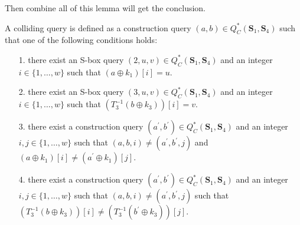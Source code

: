 Then combine all of this lemma will get the conclusion.






A colliding query is defined as a construction query $(a, b) \in Q_{C}^{*}\left(\mathbf{S}_{1},\mathbf{S}_{4}\right)$ such that one of the following conditions holds:

\begin{itemize}
  \item[1.]
  there exist an S-box query $(2, u, v) \in Q_{C}^{*}\left(\mathbf{S}_{1},\mathbf{S}_{4}\right)$ and an integer $i \in\{1, \ldots, w\}$ such that $\left(a \oplus k_{1}\right)[i]=u$.
  \item[2.]
  there exist an S-box query $(3, u, v) \in Q_{C}^{*}\left(\mathbf{S}_{1},\mathbf{S}_{4}\right)$ and an integer $i \in\{1, \ldots, w\}$ such that $\left(T_{3}^{-1}\left(b \oplus k_{3}\right)\right)[i]=v$.
  \item[3.]
  there exist a construction query $\left(a^{\prime}, b^{\prime}\right) \in Q_{C}^{*}\left(\mathbf{S}_{1},\mathbf{S}_{4}\right)$ and an integer $i,j \in\{1, \ldots, w\}$ such that $(a, b, i) \neq\left(a^{\prime}, b^{\prime}, j\right)$ and $\left(a \oplus k_{1}\right)[i] \neq \left(a^{\prime} \oplus k_{1}\right)[j]$.
  \item[4.]
  there exist a construction query $\left(a^{\prime}, b^{\prime}\right) \in Q_{C}^{*}\left(\mathbf{S}_{1},\mathbf{S}_{4}\right)$ and an integer $i,j \in\{1, \ldots, w\}$ such that $(a, b, i) \neq\left(a^{\prime}, b^{\prime}, j\right)$ such that $\left(T_{3}^{-1}\left(b \oplus k_{3}\right)\right)[i] \neq \left(T_{3}^{-1}\left(b^{\prime} \oplus k_{3}\right)\right)[j]$.
\end{itemize}

